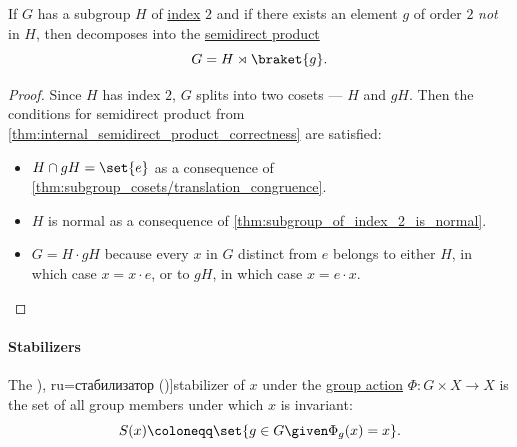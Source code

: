 \begin{proposition}\label{thm:index_2_semidirect_product}
  If \( G \) has a subgroup \( H \) of \hyperref[def:subgroup_index]{index} \( 2 \) and if there exists an element \( g \) of order \( 2 \) \emph{not} in \( H \), then decomposes into the \hyperref[def:internal_semidirect_product]{semidirect product}
  \begin{equation*}
    G = H \rtimes \braket{ g }.
  \end{equation*}
\end{proposition}
\begin{proof}
  Since \( H \) has index \( 2 \), \( G \) splits into two cosets --- \( H \) and \( gH \). Then the conditions for semidirect product from \cref{thm:internal_semidirect_product_correctness} are satisfied:
  \begin{itemize}
    \item \( H \cap gH = \set{ e } \) as a consequence of \cref{thm:subgroup_cosets/translation_congruence}.
    \item \( H \) is normal as a consequence of \cref{thm:subgroup_of_index_2_is_normal}.
    \item \( G = H \cdot gH \) because every \( x \) in \( G \) distinct from \( e \) belongs to either \( H \), in which case \( x = x \cdot e \), or to \( gH \), in which case \( x = e \cdot x \).
  \end{itemize}
\end{proof}

\paragraph{Stabilizers}

\begin{definition}\label{def:group_action_stabilizer}
  The \term[bg=стабилизатор (\cite[def. IV.19]{ГеновМиховскиМоллов1991Алгебра}), ru=стабилизатор (\cite[179]{Винберг2014КурсАлгебры})]{stabilizer} of \( x \) under the \hyperref[def:group_action]{group action} \( \Phi: G \times X \to X \) is the set of all group members under which \( x \) is invariant:
  \begin{equation*}
    S(x) \coloneqq \set{ g \in G \given \Phi_g(x) = x }.
  \end{equation*}
\end{definition}

